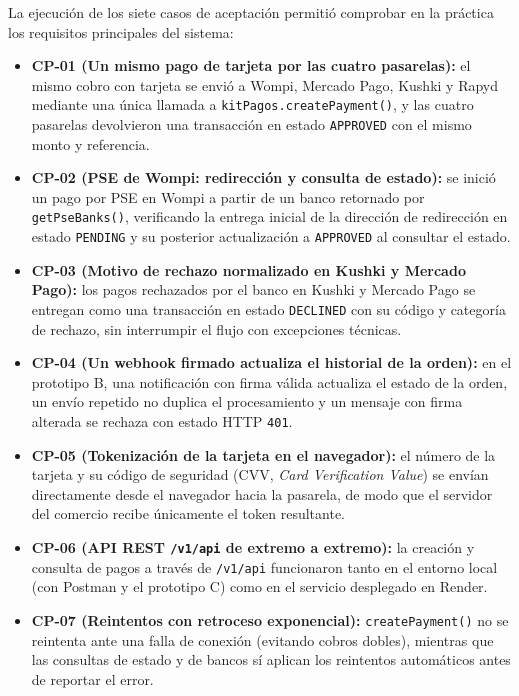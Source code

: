 La ejecución de los siete casos de aceptación permitió comprobar en la práctica los requisitos principales del sistema:
\begin{itemize}
    \item \textbf{CP-01 (Un mismo pago de tarjeta por las cuatro pasarelas):} el mismo cobro con tarjeta se envió a Wompi, Mercado Pago, Kushki y Rapyd mediante una única llamada a \texttt{kitPagos.createPayment()}, y las cuatro pasarelas devolvieron una transacción en estado \texttt{APPROVED} con el mismo monto y referencia.
    \item \textbf{CP-02 (PSE de Wompi: redirección y consulta de estado):} se inició un pago por PSE en Wompi a partir de un banco retornado por \texttt{getPseBanks()}, verificando la entrega inicial de la dirección de redirección en estado \texttt{PENDING} y su posterior actualización a \texttt{APPROVED} al consultar el estado.
    \item \textbf{CP-03 (Motivo de rechazo normalizado en Kushki y Mercado Pago):} los pagos rechazados por el banco en Kushki y Mercado Pago se entregan como una transacción en estado \texttt{DECLINED} con su código y categoría de rechazo, sin interrumpir el flujo con excepciones técnicas.
    \item \textbf{CP-04 (Un webhook firmado actualiza el historial de la orden):} en el prototipo B, una notificación con firma válida actualiza el estado de la orden, un envío repetido no duplica el procesamiento y un mensaje con firma alterada se rechaza con estado HTTP \texttt{401}.
    \item \textbf{CP-05 (Tokenización de la tarjeta en el navegador):} el número de la tarjeta y su código de seguridad (CVV, \textit{Card Verification Value}) se envían directamente desde el navegador hacia la pasarela, de modo que el servidor del comercio recibe únicamente el token resultante.
    \item \textbf{CP-06 (API REST \texttt{/v1/api} de extremo a extremo):} la creación y consulta de pagos a través de \texttt{/v1/api} funcionaron tanto en el entorno local (con Postman y el prototipo C) como en el servicio desplegado en Render.
    \item \textbf{CP-07 (Reintentos con retroceso exponencial):} \texttt{createPayment()} no se reintenta ante una falla de conexión (evitando cobros dobles), mientras que las consultas de estado y de bancos sí aplican los reintentos automáticos antes de reportar el error.
\end{itemize}

